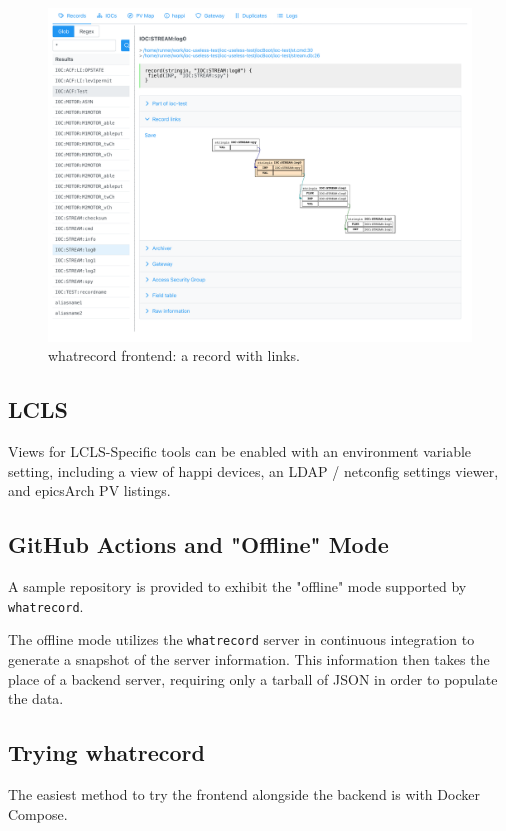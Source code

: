 \documentclass[letter,
               keeplastbox,   %
               ]{jacow}
\begin{document}
\begin{figure}
   \centering
   \includegraphics*[width=.9\columnwidth]{whatrecord-ioc-stream-log0}
   \caption{whatrecord frontend: a record with links.}
   \label{fig:whatrecord-links}
\end{figure}

\subsection{LCLS}
Views for LCLS-Specific tools can be enabled with an environment variable
setting, including a view of happi devices, an LDAP / netconfig settings
viewer, and epicsArch PV listings.

\subsection{GitHub Actions and "Offline" Mode}

A sample repository\cite{gha-sample} is provided to exhibit the "offline" mode
supported by \verb_whatrecord_.

The offline mode utilizes the \verb_whatrecord_ server in continuous
integration to generate a snapshot of the server information. This information
then takes the place of a backend server, requiring only a tarball of JSON in
order to populate the data.

\subsection{Trying whatrecord}

The easiest method to try the frontend alongside the backend is with Docker Compose.
\end{document}
